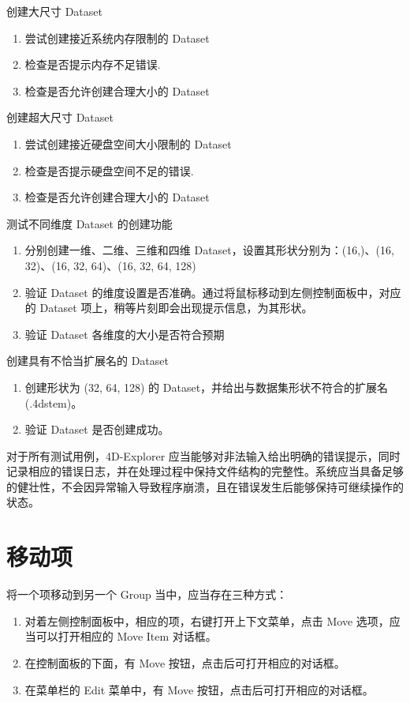 \documentclass[a4paper,12pt]{report}	%
\begin{document}
创建大尺寸 Dataset
\begin{enumerate}
    \item 尝试创建接近系统内存限制的 Dataset
    \item 检查是否提示内存不足错误.
    \item 检查是否允许创建合理大小的 Dataset
\end{enumerate}

创建超大尺寸 Dataset 
\begin{enumerate}
    \item 尝试创建接近硬盘空间大小限制的 Dataset 
    \item 检查是否提示硬盘空间不足的错误.
    \item 检查是否允许创建合理大小的 Dataset 
\end{enumerate}

测试不同维度 Dataset 的创建功能
\begin{enumerate}
    \item 分别创建一维、二维、三维和四维 Dataset，设置其形状分别为：(16,)、(16, 32)、(16, 32, 64)、(16, 32, 64, 128)
    \item 验证 Dataset 的维度设置是否准确。通过将鼠标移动到左侧控制面板中，对应的 Dataset 项上，稍等片刻即会出现提示信息，为其形状。
    \item 验证 Dataset 各维度的大小是否符合预期
\end{enumerate}

创建具有不恰当扩展名的 Dataset 
\begin{enumerate}
    \item 创建形状为 (32, 64, 128) 的 Dataset，并给出与数据集形状不符合的扩展名 (.4dstem)。
    \item 验证 Dataset 是否创建成功。
\end{enumerate}

对于所有测试用例，4D-Explorer 应当能够对非法输入给出明确的错误提示，同时记录相应的错误日志，并在处理过程中保持文件结构的完整性。系统应当具备足够的健壮性，不会因异常输入导致程序崩溃，且在错误发生后能够保持可继续操作的状态。

\section{移动项}

将一个项移动到另一个 Group 当中，应当存在三种方式：
\begin{enumerate}
    \item 对着左侧控制面板中，相应的项，右键打开上下文菜单，点击 Move 选项，应当可以打开相应的 Move Item 对话框。
    \item 在控制面板的下面，有 Move 按钮，点击后可打开相应的对话框。
    \item 在菜单栏的 Edit 菜单中，有 Move 按钮，点击后可打开相应的对话框。 
\end{enumerate}
\end{document}
